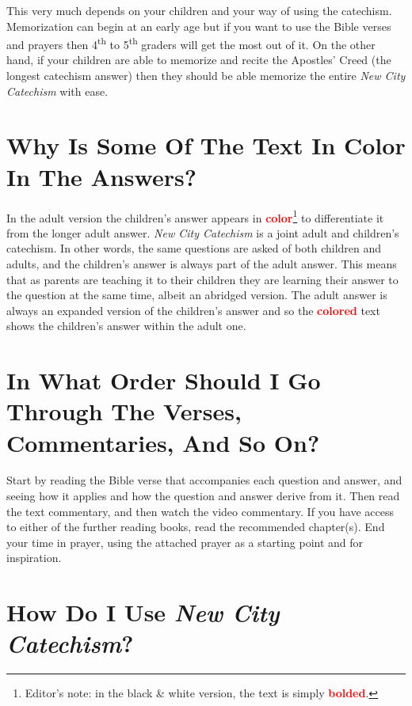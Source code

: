 \documentclass[titlepage]{memoir}
\newcommand\Children[1]{\textbf{\textcolor{red}{#1}}}
\begin{document}
This very much depends on your children and your way of using the catechism. Memorization can begin at an early age but if you want to use the Bible verses and prayers then 4\textsuperscript{th} to 5\textsuperscript{th} graders will get the most out of it. On the other hand, if your children are able to memorize and recite the Apostles' Creed (the longest catechism answer) then they should be able memorize the entire \emph{New City Catechism}\/ with ease.

\section[Why Is Some Of The Text In Color In The Answers?][Why Is Some Of The Text In Color?]{Why Is Some Of The Text In Color In The Answers?}

In the adult version the children's answer appears in \Children{color}\footnote{Editor's note: in the black \& white version, the text is simply \Children{bolded}.} to differentiate it from the longer adult answer. \emph{New City Catechism}\/ is a joint adult and children's catechism. In other words, the same questions are asked of both children and adults, and the children's answer is always part of the adult answer. This means that as parents are teaching it to their children they are learning their answer to the question at the same time, albeit an abridged version. The adult answer is always an expanded version of the children's answer and so the \Children{colored} text shows the children's answer within the adult one.

\section[In What Order Should I Go Through The Verses, Commentaries, And So On?][Use Of The Additional Resources]{In What Order Should I Go Through The Verses, Commentaries, And So On?}

Start by reading the Bible verse that accompanies each question and answer, and seeing how it applies and how the question and answer derive from it. Then read the text commentary, and then watch the video commentary. If you have access to either of the further reading books, read the recommended chapter(s). End your time in prayer, using the attached prayer as a starting point and for inspiration.

\section[How Do I Use {\em New City Catechism}?][How To Use {\em New City Catechism}]{How Do I Use {\em New City Catechism}?}
\end{document}
